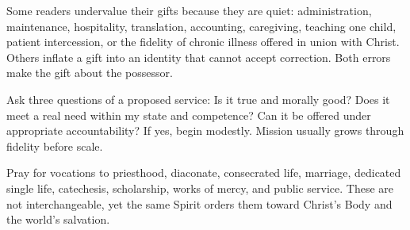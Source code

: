 Some readers undervalue their gifts because they are quiet: administration, maintenance, hospitality, translation, accounting, caregiving, teaching one child, patient intercession, or the fidelity of chronic illness offered in union with Christ. Others inflate a gift into an identity that cannot accept correction. Both errors make the gift about the possessor.

Ask three questions of a proposed service: Is it true and morally good? Does it meet a real need within my state and competence? Can it be offered under appropriate accountability? If yes, begin modestly. Mission usually grows through fidelity before scale.

Pray for vocations to priesthood, diaconate, consecrated life, marriage, dedicated single life, catechesis, scholarship, works of mercy, and public service. These are not interchangeable, yet the same Spirit orders them toward Christ's Body and the world's salvation.




